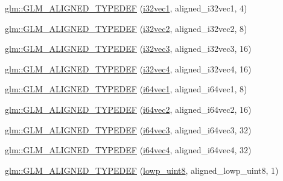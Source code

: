 \begin{DoxyCompactItemize}
\item 
\hyperlink{group__gtx__type__aligned_ga904e9c2436bb099397c0823506a0771f}{glm\+::\+G\+L\+M\+\_\+\+A\+L\+I\+G\+N\+E\+D\+\_\+\+T\+Y\+P\+E\+D\+EF} (\hyperlink{group__gtc__type__precision_ga97351dd7f0ede9b8b79943f4adcd6a65}{i32vec1}, aligned\+\_\+i32vec1, 4)
\item 
\hyperlink{group__gtx__type__aligned_gaf90651cf2f5e7ee2b11cfdc5a6749534}{glm\+::\+G\+L\+M\+\_\+\+A\+L\+I\+G\+N\+E\+D\+\_\+\+T\+Y\+P\+E\+D\+EF} (\hyperlink{group__gtc__type__precision_ga99191e0de942ecc1df32d522f8064789}{i32vec2}, aligned\+\_\+i32vec2, 8)
\item 
\hyperlink{group__gtx__type__aligned_ga7354a4ead8cb17868aec36b9c30d6010}{glm\+::\+G\+L\+M\+\_\+\+A\+L\+I\+G\+N\+E\+D\+\_\+\+T\+Y\+P\+E\+D\+EF} (\hyperlink{group__gtc__type__precision_ga9811a4ec26e517ea85c785d3f3f4baac}{i32vec3}, aligned\+\_\+i32vec3, 16)
\item 
\hyperlink{group__gtx__type__aligned_gad2ecbdea18732163e2636e27b37981ee}{glm\+::\+G\+L\+M\+\_\+\+A\+L\+I\+G\+N\+E\+D\+\_\+\+T\+Y\+P\+E\+D\+EF} (\hyperlink{group__gtc__type__precision_ga78c16dde5527264e8085b375efba6f28}{i32vec4}, aligned\+\_\+i32vec4, 16)
\item 
\hyperlink{group__gtx__type__aligned_ga965b1c9aa1800e93d4abc2eb2b5afcbf}{glm\+::\+G\+L\+M\+\_\+\+A\+L\+I\+G\+N\+E\+D\+\_\+\+T\+Y\+P\+E\+D\+EF} (\hyperlink{group__gtc__type__precision_gad2bbfb4ed2d4b1e1551c721f81739e49}{i64vec1}, aligned\+\_\+i64vec1, 8)
\item 
\hyperlink{group__gtx__type__aligned_ga1f9e9c2ea2768675dff9bae5cde2d829}{glm\+::\+G\+L\+M\+\_\+\+A\+L\+I\+G\+N\+E\+D\+\_\+\+T\+Y\+P\+E\+D\+EF} (\hyperlink{group__gtc__type__precision_ga8654a1b3a6f81677f53eec13f8dd4224}{i64vec2}, aligned\+\_\+i64vec2, 16)
\item 
\hyperlink{group__gtx__type__aligned_gad77c317b7d942322cd5be4c8127b3187}{glm\+::\+G\+L\+M\+\_\+\+A\+L\+I\+G\+N\+E\+D\+\_\+\+T\+Y\+P\+E\+D\+EF} (\hyperlink{group__gtc__type__precision_gad7aa290b2d88847999c1305ed5c82669}{i64vec3}, aligned\+\_\+i64vec3, 32)
\item 
\hyperlink{group__gtx__type__aligned_ga716f8ea809bdb11b5b542d8b71aeb04f}{glm\+::\+G\+L\+M\+\_\+\+A\+L\+I\+G\+N\+E\+D\+\_\+\+T\+Y\+P\+E\+D\+EF} (\hyperlink{group__gtc__type__precision_ga77db970d924dd55ac93e00391ad4a10e}{i64vec4}, aligned\+\_\+i64vec4, 32)
\item 
\hyperlink{group__gtx__type__aligned_gad46f8e9082d5878b1bc04f9c1471cdaa}{glm\+::\+G\+L\+M\+\_\+\+A\+L\+I\+G\+N\+E\+D\+\_\+\+T\+Y\+P\+E\+D\+EF} (\hyperlink{group__gtc__type__precision_ga4d9dc08b7b248a386dfe9afd00fc6b1e}{lowp\+\_\+uint8}, aligned\+\_\+lowp\+\_\+uint8, 1)

\end{DoxyCompactItemize}
